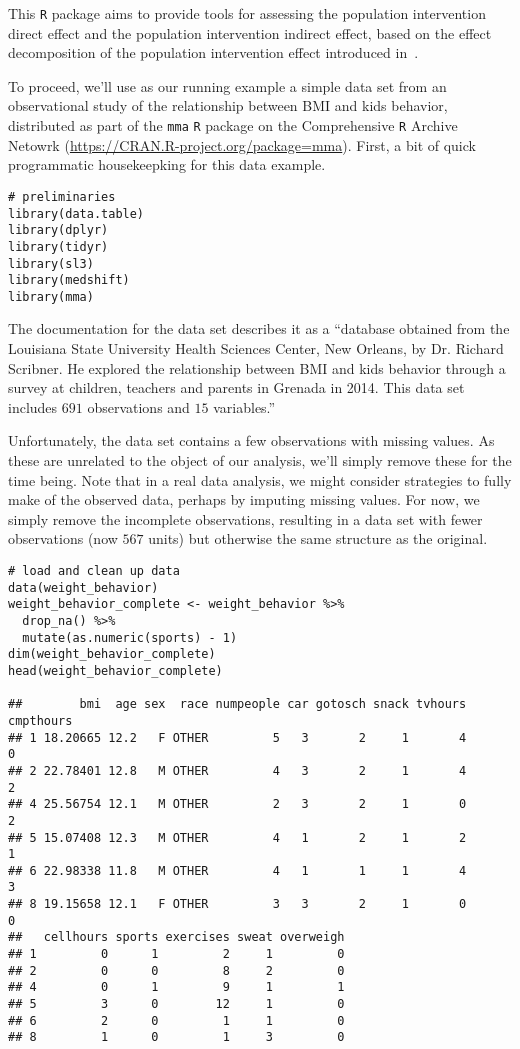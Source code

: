 This \texttt{R} package aims to provide tools for assessing the population
intervention direct effect and the population intervention indirect effect,
based on the effect decomposition of the population intervention effect
introduced in~\citet{diaz2020causal}.

To proceed, we'll use as our running example a simple data set from an
observational study of the relationship between BMI and kids behavior,
distributed as part of the \texttt{mma} \texttt{R} package on the Comprehensive
\texttt{R} Archive Netowrk (\url{https://CRAN.R-project.org/package=mma}).
First, a bit of quick programmatic housekeepking for this data example.

\begin{lstlisting}
# preliminaries
library(data.table)
library(dplyr)
library(tidyr)
library(sl3)
library(medshift)
library(mma)
\end{lstlisting}

The documentation for the data set describes it as a ``database obtained from
the Louisiana State University Health Sciences Center, New Orleans, by  Dr.
Richard Scribner. He  explored the relationship  between BMI and kids behavior
through a survey at children, teachers and parents in Grenada in 2014. This data
set includes $691$ observations and $15$ variables.''

Unfortunately, the data set contains a few observations with missing values. As
these are unrelated to the object of our analysis, we'll simply remove these for
the time being. Note that in a real data analysis, we might consider strategies
to fully make of the observed data, perhaps by imputing missing values. For now,
we simply remove the incomplete observations, resulting in a data set with fewer
observations (now $567$ units) but otherwise the same structure as the original.

\begin{lstlisting}
# load and clean up data
data(weight_behavior)
weight_behavior_complete <- weight_behavior %>%
  drop_na() %>%
  mutate(as.numeric(sports) - 1)
dim(weight_behavior_complete)
head(weight_behavior_complete)

##        bmi  age sex  race numpeople car gotosch snack tvhours cmpthours
## 1 18.20665 12.2   F OTHER         5   3       2     1       4         0
## 2 22.78401 12.8   M OTHER         4   3       2     1       4         2
## 4 25.56754 12.1   M OTHER         2   3       2     1       0         2
## 5 15.07408 12.3   M OTHER         4   1       2     1       2         1
## 6 22.98338 11.8   M OTHER         4   1       1     1       4         3
## 8 19.15658 12.1   F OTHER         3   3       2     1       0         0
##   cellhours sports exercises sweat overweigh
## 1         0      1         2     1         0
## 2         0      0         8     2         0
## 4         0      1         9     1         1
## 5         3      0        12     1         0
## 6         2      0         1     1         0
## 8         1      0         1     3         0
\end{lstlisting}

